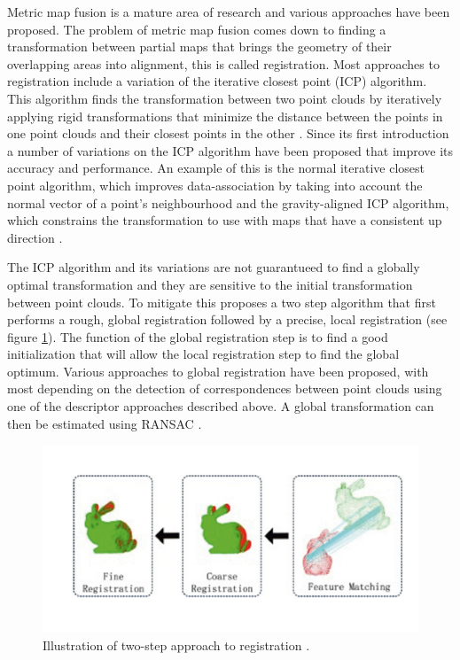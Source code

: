 Metric map fusion is a mature area of research and various approaches have been proposed. The problem of metric map fusion comes down to finding a transformation between partial maps that brings the geometry of their overlapping areas into alignment, this is called registration. Most approaches to registration include a variation of the iterative closest point (ICP) algorithm. This algorithm finds the transformation between two point clouds by iteratively applying rigid transformations that minimize the distance between the points in one point clouds and their closest points in the other \citep{rusinkiewicz_efficient_2001}. Since its first introduction a number of variations on the ICP algorithm have been proposed that improve its accuracy and performance. An example of this is the normal iterative closest point algorithm, which improves data-association by taking into account the normal vector of a point's neighbourhood and the gravity-aligned ICP algorithm, which constrains the transformation to use with maps that have a consistent up direction \citep{serafin_nicp_2015,kubelka_gravity-constrained_2022}. 

The ICP algorithm and its variations are not guarantueed to find a globally optimal transformation and they are sensitive to the initial transformation between point clouds. To mitigate this \citet{yang_fast_2016} proposes a two step algorithm that first performs a rough, global registration followed by a precise, local registration (see figure \ref{fig:global_local}). The function of the global registration step is to find a good initialization that will allow the local registration step to find the global optimum. Various approaches to global registration have been proposed, with most depending on the detection of correspondences between point clouds using one of the descriptor approaches described above. A global transformation can then be estimated using RANSAC \citep{koguciuk_parallel_2017}.

\begin{figure}[h]
    \centering
    \includegraphics*[width=\textwidth]{./fig/feature_matching.png}
    \caption{Illustration of two-step approach to registration \citep{yang_fast_2016}.}
    \label{fig:global_local}
\end{figure}

